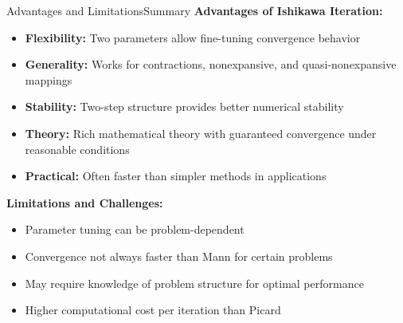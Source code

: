 \documentclass[aspectratio=169,10pt]{beamer}
\begin{document}
\begin{frame}{Advantages and Limitations}{Summary}
\textbf{Advantages of Ishikawa Iteration:}
\begin{itemize}
    \item \textbf{Flexibility:} Two parameters allow fine-tuning convergence behavior
    \item \textbf{Generality:} Works for contractions, nonexpansive, and quasi-nonexpansive mappings
    \item \textbf{Stability:} Two-step structure provides better numerical stability
    \item \textbf{Theory:} Rich mathematical theory with guaranteed convergence under reasonable conditions
    \item \textbf{Practical:} Often faster than simpler methods in applications
\end{itemize}

\vspace{0.3cm}

\textbf{Limitations and Challenges:}
\begin{itemize}
    \item Parameter tuning can be problem-dependent
    \item Convergence not always faster than Mann for certain problems
    \item May require knowledge of problem structure for optimal performance
    \item Higher computational cost per iteration than Picard
\end{itemize}
\end{frame}
\end{document}
